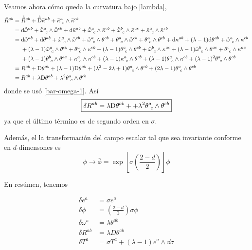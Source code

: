 Veamos ahora cómo queda la curvatura bajo \eqref{lambda},
\begin{align*}
  \bar{R}^{ab}&=\mathring{\bar{R}}^{ab}+\mathring{\bar{\mathrm{D}}}\bar{\kappa}^{ab}+\bar{\kappa}^{a}_{~c}\wedge \bar{\kappa}^{cb}\\
  &=\dd\mathring{\bar{\omega}}^{ab}+\mathring{\bar{\omega}}^{a}_{~c}\wedge\mathring{\bar{\omega}}^{cb}+\dd\bar{\kappa}^{ab}+\mathring{\bar{\omega}}^{a}_{~c}\wedge \bar{\kappa}^{cb}+\mathring{\bar{\omega}}^{b}_{~c}\wedge \bar{\kappa}^{ac}+\bar{\kappa}^{a}_{~c}\wedge\bar{\kappa}^{cb}\\
  &=\dd\mathring{\omega}^{ab}+\dd\theta^{ab}+\mathring{\omega}^{a}_{~c}\wedge \mathring{\omega}^{cb}+\mathring{\omega}^{a}_{~c}\wedge \theta^{cb}+\theta^{a}_{~c}\wedge \mathring{\omega}^{cb}+\theta^{a}_{~c}\wedge \theta^{cb}+\dd\kappa^{ab}+(\lambda-1)\dd\theta^{ab}+\mathring{\omega}^{a}_{~c}\wedge\kappa^{cb}\\&~~~~+(\lambda-1)\mathring{\omega}^{a}_{~c}\wedge\theta^{cb}+\theta^{a}_{~c}\wedge\kappa^{cb}+(\lambda-1)\theta^{a}_{~c}\wedge\theta^{cb}+\mathring{\omega}^b_{~c}\wedge\kappa^{ac}+(\lambda-1)\mathring{\omega}^b_{~c}\wedge\theta^{ac}+\theta^c_{~c}\wedge\kappa^{ac}\\
  &~~~~+(\lambda-1)\theta^b_{~c}\wedge\theta^{ac}+\kappa^{a}_{~c}\wedge\kappa^{cb}+(\lambda-1)\kappa^{a}_{~c}\wedge\theta^{cb}+(\lambda-1)\theta^{a}_{~c}\wedge\kappa^{cb}+(\lambda-1)^2\theta^{a}_{~c}\wedge\theta^{cb}\\
  &=R^{ab}+\mathrm{D}\theta^{ab}+(\lambda-1)\mathrm{D}\theta^{ab}+(\lambda^2-2\lambda+1)\theta^{a}_{~c}\wedge\theta^{cb}+(2\lambda-1)\theta^{a}_{~c}\wedge\theta^{cb}\\
  &=R^{ab}+\lambda\mathrm{D}\theta^{ab}+\lambda^2\theta^{a}_{~c}\wedge\theta^{cb}
 \end{align*}
 donde se usó \eqref{bar-omega-1}. Así
 \begin{equation}
  \boxed{\delta R^{ab}=\lambda\mathrm{D}\theta^{ab}++\lambda^2\theta^{a}_{~c}\wedge\theta^{cb}}
\end{equation}
ya que el último término es de segundo orden en $\sigma$.

Además, el la transformación del campo escalar tal que sea invariante conforme en $d$-dimensones es \cite{Martinez:1996gn}
\begin{equation}
  \phi\to \bar{\phi}=\exp\left[\sigma\left(\frac{2-d}{2}\right)\right]\phi
\end{equation}


En resúmen, tenemos
\begin{tcolorbox}
\begin{subequations}\label{infini}
\begin{align}
    \delta e^{a}&=\sigma e^{a}\\
    \delta \phi&=\left(\frac{2-d}{2}\right)\sigma\phi\\
    \delta\omega^{a}&=\lambda \theta^{ab}\\
    \delta R^{ab}&=\lambda D\theta^{ab}\\
    \delta T^{a}&=\sigma T^{a}+(\lambda-1)e^{a}\wedge\dd\sigma
\end{align}
\end{subequations}
\end{tcolorbox}


